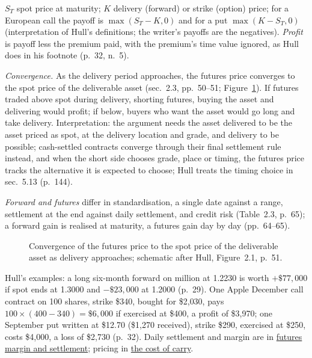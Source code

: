 \begin{qfdefinition}
 $S_T$ spot price at maturity; $K$ delivery (forward) or strike (option) price; for a European call the payoff is $\max(S_T-K,0)$ and for a put $\max(K-S_T,0)$ (interpretation of Hull's definitions; the writer's payoffs are the negatives). \emph{Profit} is payoff less the premium paid, with the premium's time value ignored, as Hull does in his footnote (p.~32, n.~5).

 \emph{Convergence.} As the delivery period approaches, the futures price converges to the spot price of the deliverable asset (sec.~2.3, pp.~50--51; Figure~\ref{fig:futures-convergence}). If futures traded above spot during delivery, shorting futures, buying the asset and delivering would profit; if below, buyers who want the asset would go long and take delivery. Interpretation: the argument needs the asset delivered to be the asset priced as spot, at the delivery location and grade, and delivery to be possible; cash-settled contracts converge through their final settlement rule instead, and when the short side chooses grade, place or timing, the futures price tracks the alternative it is expected to choose; Hull treats the timing choice in sec.~5.13 (p.~144).

\emph{Forward and futures} differ in standardisation, a single date against a range, settlement at the end against daily settlement, and credit risk (Table~2.3, p.~65); a forward gain is realised at maturity, a futures gain day by day (pp.~64--65).
\begin{figure}[ht]
\centering

\caption{Convergence of the futures price to the spot price of the deliverable asset as delivery approaches; schematic after Hull, Figure~2.1, p.~51.}\label{fig:futures-convergence}
\end{figure}

 Hull's examples: a long six-month forward on  million at 1.2230 is worth $+\$77{,}000$ if spot ends at 1.3000 and $-\$23{,}000$ at 1.2000 (p.~29). One Apple December call contract on 100 shares, strike \$340, bought for \$2{,}030, pays $100\times(400-340)=\$6{,}000$ if exercised at \$400, a profit of \$3{,}970; one September put written at \$12.70 (\$1{,}270 received), strike \$290, exercised at \$250, costs \$4{,}000, a loss of \$2{,}730 (p.~32). Daily settlement and margin are in \hyperref[mech:futures-margin-settlement]{futures margin and settlement}; pricing in \hyperref[res:cost-of-carry-forward-price]{the cost of carry}.


\end{qfdefinition}
